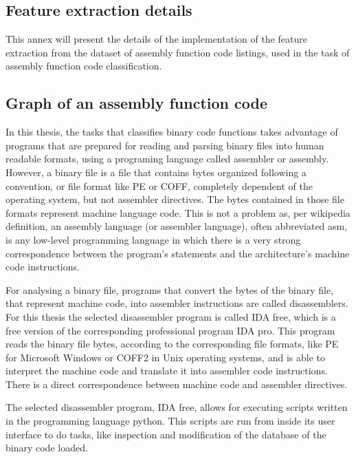 \begin{appendices}


\section{Feature extraction details}

This annex will present the details of the implementation of the feature extraction from the dataset of assembly function code listings, used in the task of assembly function code classification.

\subsection{Graph of an assembly function code}

In this thesis, the tasks that classifies binary code functions takes advantage of programs that are prepared for reading and parsing binary files into human readable formats, using a programing language called assembler or assembly. However, a binary file is a file that contains bytes organized following a convention, or file format like PE or COFF, completely dependent of the operating system, but not assembler directives. The bytes contained in those file formats represent machine language code. This is not a problem as, per wikipedia definition, an assembly language (or assembler language), often abbreviated asm, is any low-level programming language in which there is a very strong correspondence between the program's statements and the architecture's machine code instructions. 


For analysing a binary file, programs that convert the bytes of the binary file, that represent machine code, into assembler instructions are called disassemblers. For this thesis the selected disassembler program is called IDA free, which is a free version of the corresponding professional program IDA pro. This program reads the binary file bytes, according to the corresponding file formats, like PE for Microsoft Windows or COFF2 in Unix operating systems, and is able to interpret the machine code and translate it into assembler code instructions. There is a direct correspondence between machine code and assembler directives.

The selected disassembler program, IDA free, allows for executing scripts written in the programming language python. This scripts are run from inside its user interface to do tasks, like inspection and modification of the database of the binary code loaded.


\end{appendices}
